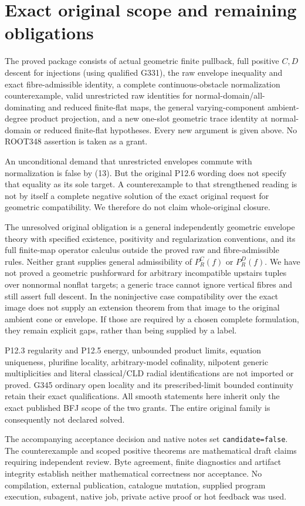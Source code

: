 \section{Exact original scope and remaining obligations}
\label{sec:scope}
The proved package consists of actual geometric finite pullback,
full positive \(C,D\) descent for injections (using qualified
G331), the raw envelope inequality and exact fibre-admissible
identity, a complete continuous-obstacle normalization
counterexample, valid unrestricted raw identities for
normal-domain/all-dominating and reduced finite-flat maps,
the general varying-component ambient-degree product
projection, and a new one-slot geometric trace identity
at normal-domain or reduced finite-flat hypotheses.
Every new argument is given above. No ROOT348 assertion
is taken as a grant.

An unconditional demand that unrestricted envelopes commute
with normalization is false by (13). But the original
P12.6 wording does not specify that equality as its sole
target. A counterexample to that strengthened reading is
not by itself a complete negative solution of the exact
original request for geometric compatibility. We therefore
do not claim whole-original closure.

The unresolved original obligation is a general independently
geometric envelope theory with specified existence, positivity
and regularization conventions, and its full finite-map
operator calculus outside the proved raw and fibre-admissible
rules. Neither grant supplies general admissibility of
\(P_R^C(f)\) or \(P_R^D(f)\). We have not proved a geometric
pushforward for arbitrary incompatible upstairs tuples over
nonnormal nonflat targets; a generic trace cannot ignore
vertical fibres and still assert full descent. In the
noninjective case compatibility over the exact image does
not supply an extension theorem from that image to the
original ambient cone or envelope. If those are required
by a chosen complete formulation, they remain explicit
gaps, rather than being supplied by a label.

P12.3 regularity and P12.5 energy, unbounded product limits,
equation uniqueness, plurifine locality, arbitrary-model
cofinality, nilpotent generic multiplicities and literal
classical/CLD radial identifications are not imported or
proved. G345 ordinary open locality and its prescribed-limit
bounded continuity retain their exact qualifications.
All smooth statements here inherit only the exact published
BFJ scope of the two grants.
The entire original family is consequently not declared solved.

The accompanying acceptance decision and native notes set
\texttt{candidate=false}. The counterexample and scoped
positive theorems are mathematical draft claims requiring
independent review. Byte agreement, finite diagnostics and
artifact integrity establish neither mathematical correctness
nor acceptance. No compilation, external publication,
catalogue mutation, supplied program execution, subagent,
native job, private active proof or hot feedback was used.
